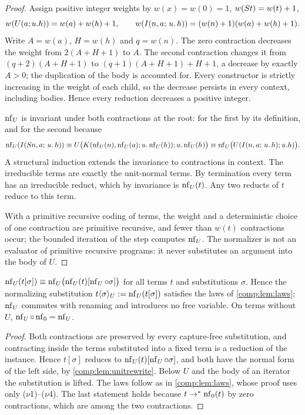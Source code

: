 \begin{proof}
Assign positive integer weights by $w(x)=w(0)=1$, $w(S t)=w(t)+1$,
\[
 w(U(a;u.h))=w(a)+w(h)+1,\qquad
 w(I(n,a;\,u.\,h))=(w(n)+1)(w(a)+w(h)+1).
\]
Write $A=w(a)$, $H=w(h)$ and $q=w(n)$. The zero contraction decreases the
weight from $2(A+H+1)$ to $A$. The second contraction changes it from
$(q+2)(A+H+1)$ to $(q+1)(A+H+1)+H+1$, a decrease by exactly $A>0$; the
duplication of the body is accounted for. Every constructor is strictly
increasing in the weight of each child, so the decrease persists in every
context, including bodies. Hence every reduction decreases a positive
integer.

$\operatorname{nf}_U$ is invariant under both contractions at the root: for the first by
its definition, and for the second because
\[
 \operatorname{nf}_U(I(S n,a;\,u.\,h))
 \equiv U\bigl(K(\operatorname{nf}_U(n),\operatorname{nf}_U(a);u.\operatorname{nf}_U(h));u.\operatorname{nf}_U(h)\bigr)
 \equiv\operatorname{nf}_U\bigl(U(I(n,a;\,u.\,h);u.h)\bigr).
\]
A structural induction extends the invariance to contractions in context.
The irreducible terms are exactly the unit-normal terms. By termination
every term has an irreducible reduct, which by invariance is $\operatorname{nf}_U(t)$. Any
two reducts of $t$ reduce to this term.

With a primitive recursive coding of terms, the weight and a deterministic
choice of one contraction are primitive recursive, and fewer than $w(t)$
contractions occur; the bounded iteration of the step computes $\operatorname{nf}_U$. The
normalizer is not an evaluator of primitive recursive programs: it never
substitutes an argument into the body of $U$.
\end{proof}

\begin{lemma}
\label{comp:lem:unitsubst}
$\operatorname{nf}_U(t[\sigma])\equiv\operatorname{nf}_U\bigl(\operatorname{nf}_U(t)[\operatorname{nf}_U\circ\sigma]\bigr)$ for all
terms $t$ and substitutions $\sigma$. Hence the normalizing substitution
$t\langle\sigma\rangle_U\mathrel{:=}\operatorname{nf}_U(t[\sigma])$ satisfies the laws of
\cref{comp:lem:laws}; $\operatorname{nf}_U$ commutes with renaming and introduces no free
variable. On terms without $U$, $\operatorname{nf}_U\circ\operatorname{nf}_0=\operatorname{nf}_U$.
\end{lemma}

\begin{proof}
Both contractions are preserved by every capture-free substitution, and
contracting inside the terms substituted into a fixed term is a reduction of
the instance. Hence $t[\sigma]$ reduces to $\operatorname{nf}_U(t)[\operatorname{nf}_U\circ\sigma]$, and
both have the normal form of the left side, by
\cref{comp:lem:unitrewrite}. Below $U$ and the body of an iterator the
substitution is lifted. The laws follow as in \cref{comp:lem:laws}, whose
proof uses only ($\nu$1)--($\nu$4). The last statement holds because
$t\to^{*}\operatorname{nf}_0(t)$ by zero contractions, which are among the two
contractions.
\end{proof}


